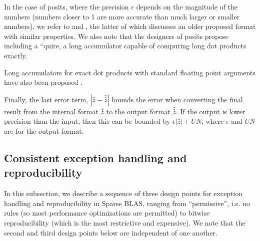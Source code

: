 \documentclass{article}
\begin{document}
In the case of posits, where the precision $\epsilon$
depends on the magnitude
of the numbers (numbers closer to 1 are more accurate than much
larger or smaller numbers), we refer to \cite{GoodBadUgly} and \cite{Demmel87}, the latter of which discusses an older proposed
format with similar properties.
We also note that the designers of posits propose including a
``quire, a long accumulator capable of computing long dot products exactly. 

Long accumulators for
exact dot products with standard floating point
arguments have also been proposed
\cite{ExactDotProduct}.

Finally, the last error term, $|\hat{z} - \hat{\hat{z}}|$ bounds the
error when converting the final result from the internal format $\hat{z}$ to
the output format $\hat{\hat{z}}$. If the output is lower precision than the input,
then this can be bounded by $\epsilon |\hat{z}| + UN$, where 
$\epsilon$ and $UN$ are for the output format.


\iffalse
\subsection{Consistent exception handling and reproducibility}

In this subsection, we describe a sequence of three design points for exception handling and reproducibility in Sparse BLAS, ranging from “permissive”, i.e. no rules (so most performance optimizations are permitted) to bitwise reproducibility (which is the most restrictive and expensive). We note that the second and third design points
below are independent of one another.
\end{document}
